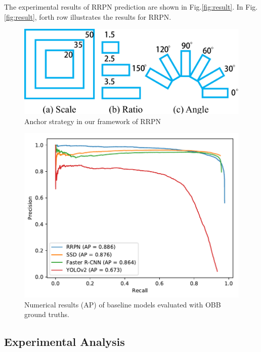 The experimental results of RRPN prediction are shown in Fig.\ref{fig:result}. In Fig.\ref{fig:result}, forth row illustrates the results for RRPN.



\begin{figure}
	\includegraphics[width=\linewidth]{images/scale_ratio_angle.pdf}
	\caption{Anchor strategy in our framework of RRPN}
	\label{fig:anchors}
\end{figure}

\begin{figure}
	\includegraphics[width=\linewidth]{images/pr_rbbox.pdf}
	\caption{Numerical results (AP) of baseline models evaluated with OBB ground truths.}
	\label{fig:pr_rbbox}
\end{figure}



\subsection{Experimental Analysis}

